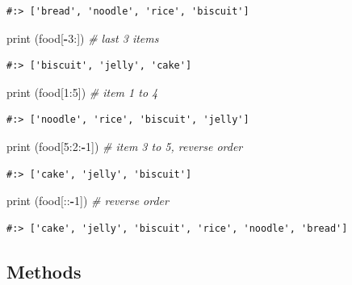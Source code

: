 \documentclass[
]{book}
\newenvironment{Shaded}{\begin{snugshade}}{\end{snugshade}}
\newcommand{\BuiltInTok}[1]{#1}
\newcommand{\CommentTok}[1]{\textcolor[rgb]{0.37,0.37,0.37}{\textit{#1}}}
\newcommand{\DecValTok}[1]{\textcolor[rgb]{0.06,0.06,0.06}{#1}}
\newcommand{\NormalTok}[1]{#1}
\newcommand{\OperatorTok}[1]{\textcolor[rgb]{0.43,0.43,0.43}{\textbf{#1}}}
\begin{document}
\begin{verbatim}
#:> ['bread', 'noodle', 'rice', 'biscuit']
\end{verbatim}

\begin{Shaded}
\begin{Highlighting}[]
\BuiltInTok{print}\NormalTok{ (food[}\OperatorTok{-}\DecValTok{3}\NormalTok{:])    }\CommentTok{# last 3 items}
\end{Highlighting}
\end{Shaded}

\begin{verbatim}
#:> ['biscuit', 'jelly', 'cake']
\end{verbatim}

\begin{Shaded}
\begin{Highlighting}[]
\BuiltInTok{print}\NormalTok{ (food[}\DecValTok{1}\NormalTok{:}\DecValTok{5}\NormalTok{])    }\CommentTok{# item 1 to 4}
\end{Highlighting}
\end{Shaded}

\begin{verbatim}
#:> ['noodle', 'rice', 'biscuit', 'jelly']
\end{verbatim}

\begin{Shaded}
\begin{Highlighting}[]
\BuiltInTok{print}\NormalTok{ (food[}\DecValTok{5}\NormalTok{:}\DecValTok{2}\NormalTok{:}\OperatorTok{-}\DecValTok{1}\NormalTok{]) }\CommentTok{# item 3 to 5, reverse order}
\end{Highlighting}
\end{Shaded}

\begin{verbatim}
#:> ['cake', 'jelly', 'biscuit']
\end{verbatim}

\begin{Shaded}
\begin{Highlighting}[]
\BuiltInTok{print}\NormalTok{ (food[::}\OperatorTok{-}\DecValTok{1}\NormalTok{])   }\CommentTok{# reverse order}
\end{Highlighting}
\end{Shaded}

\begin{verbatim}
#:> ['cake', 'jelly', 'biscuit', 'rice', 'noodle', 'bread']
\end{verbatim}

\hypertarget{methods}{%
\subsection{Methods}\label{methods}}
\end{document}
